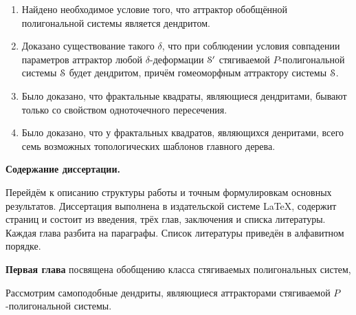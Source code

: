 \begin{enumerate}
\item Найдено необходимое условие того, что аттрактор обобщённой полигональной системы является дендритом.

\item Доказано существование такого $\delta$, что при соблюдении условия совпадении параметров аттрактор любой $\delta$-деформации ${\EuScript S}'$ стягиваемой $P$-полигональной системы ${\EuScript S}$ будет дендритом, причём гомеоморфным аттрактору системы ${\EuScript S}$.


\item Было доказано, что фрактальные квадраты, являющиеся дендритами, бывают только со свойством одноточечного пересечения.

\item Было доказано, что у фрактальных квадратов, являющихся денритами, всего семь возможных топологических шаблонов главного дерева.
\end{enumerate}

\begin{center}
    \textbf{Содержание диссертации.}
\end{center}

Перейдём к описанию структуры работы и точным формулировкам основных результатов.
Диссертация выполнена в издательской системе \LaTeX, содержит  страниц и состоит из введения, трёх глав, заключения и списка литературы.
Каждая глава разбита на параграфы.
Список литературы приведён в алфавитном порядке.

\textbf{Первая глава} посвящена обобщению класса стягиваемых полигональных систем,

Рассмотрим самоподобные дендриты, являющиеся аттракторами стягиваемой $P$-полигональной системы.



